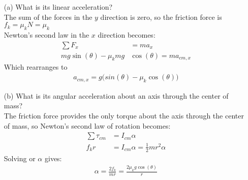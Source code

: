 \documentclass[a4paper]{article}
\begin{document}
\begin{shaded}
\begin{center}
    \end{center}
    \begin{enumerate}
        \item[(a)] What is its linear acceleration?\\
        The sum of the forces in the $y$ direction is zero, so the friction force is $f_k = \mu_kN = \mu_k$\\
        Newton's second law in the $x$ direction becomes:
        \begin{align*}
            \sum F_x &= ma_x\\
            mg\sin(\theta) - \mu_kmg&\cos(\theta) = ma_{cm,x}
        \end{align*}
        Which rearranges to 
        \begin{align*}
            a_{cm,x} = g\big(sin(\theta) - \mu_k\cos(\theta)\big)
        \end{align*}
        \item[(b)] What is its angular acceleration about an axis through the center of mass?\\
        The friction force provides the only torque about the axis through the center of mass, so Newton's second law of rotation becomes:
        \begin{align*}
            \sum\tau_{cm} &= I_{cm}\alpha\\
            f_kr &= I_{cm}\alpha = \frac{1}{2}mr^2\alpha
        \end{align*}
        Solving or $\alpha$ gives:
        \begin{align*}
            \alpha = \frac{2f_k}{mr} = \frac{2\mu_kg\cos(\theta)}{r}
        \end{align*}
    \end{enumerate}
\end{shaded}
\newpage
\end{document}
